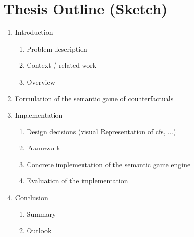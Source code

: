 \documentclass[a4paper,american]{paper}
\begin{document}
\section*{Thesis Outline (Sketch)}

\begin{enumerate}
	\item Introduction
	\begin{enumerate}
		\item Problem description
		\item Context / related work
		\item Overview
	\end{enumerate}
	\item Formulation of the semantic game of counterfactuals
	\item Implementation
	\begin{enumerate}
		\item Design decisions (visual Representation of cfs, ...)
		\item Framework
		\item Concrete implementation of the semantic game engine
		\item Evaluation of the implementation
	\end{enumerate}
	\item Conclusion
	\begin{enumerate}
		\item Summary
		\item Outlook
	\end{enumerate}
\end{enumerate}


\nocite{*}

\end{document}
